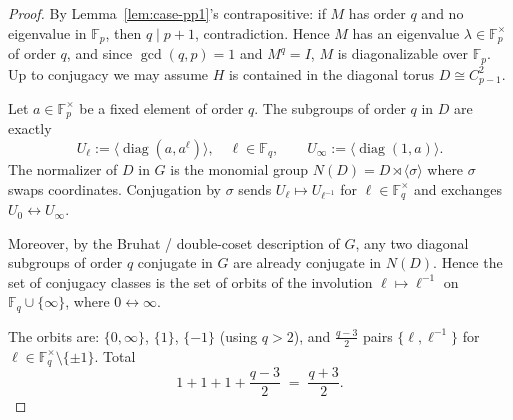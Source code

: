 \begin{proof}
By Lemma~\ref{lem:case-pp1}'s contrapositive: if $M$ has order $q$ and no eigenvalue in $\mathbb{F}_p$, then $q \mid p+1$, contradiction. Hence $M$ has an eigenvalue $\lambda \in \mathbb{F}_p^\times$ of order $q$, and since $\gcd(q,p)=1$ and $M^q=I$, $M$ is diagonalizable over $\mathbb{F}_p$. Up to conjugacy we may assume $H$ is contained in the diagonal torus $D \cong C_{p-1}^2$.

Let $a \in \mathbb{F}_p^\times$ be a fixed element of order $q$. The subgroups of order $q$ in $D$ are exactly
\[
  U_\ell := \langle \operatorname{diag}(a, a^\ell) \rangle, \quad \ell \in \mathbb{F}_q,
  \qquad
  U_\infty := \langle \operatorname{diag}(1, a) \rangle.
\]
The normalizer of $D$ in $G$ is the monomial group $N(D) = D \rtimes \langle \sigma \rangle$ where $\sigma$ swaps coordinates. Conjugation by $\sigma$ sends $U_\ell \mapsto U_{\ell^{-1}}$ for $\ell \in \mathbb{F}_q^\times$ and exchanges $U_0 \leftrightarrow U_\infty$.

Moreover, by the Bruhat / double-coset description of $G$, any two diagonal subgroups of order $q$ conjugate in $G$ are already conjugate in $N(D)$. Hence the set of conjugacy classes is the set of orbits of the involution $\ell \mapsto \ell^{-1}$ on $\mathbb{F}_q \cup \{\infty\}$, where $0 \leftrightarrow \infty$.

The orbits are: $\{0,\infty\}$, $\{1\}$, $\{-1\}$ (using $q>2$), and $\tfrac{q-3}{2}$ pairs $\{\ell,\ell^{-1}\}$ for $\ell \in \mathbb{F}_q^\times \setminus \{\pm 1\}$. Total
\[
  1 + 1 + 1 + \frac{q-3}{2} \;=\; \frac{q+3}{2}.
\]
\end{proof}


